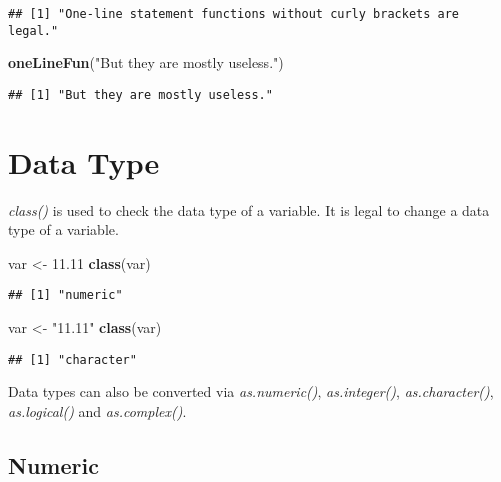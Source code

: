\documentclass[
  12pt,
]{article}
\newenvironment{Shaded}{\begin{snugshade}}{\end{snugshade}}
\newcommand{\FloatTok}[1]{\textcolor[rgb]{0.00,0.00,0.81}{#1}}
\newcommand{\FunctionTok}[1]{\textcolor[rgb]{0.13,0.29,0.53}{\textbf{#1}}}
\newcommand{\NormalTok}[1]{#1}
\newcommand{\OtherTok}[1]{\textcolor[rgb]{0.56,0.35,0.01}{#1}}
\newcommand{\StringTok}[1]{\textcolor[rgb]{0.31,0.60,0.02}{#1}}
\begin{document}
\begin{verbatim}
## [1] "One-line statement functions without curly brackets are legal."
\end{verbatim}

\begin{Shaded}
\begin{Highlighting}[]
\FunctionTok{oneLineFun}\NormalTok{(}\StringTok{"But they are mostly useless."}\NormalTok{)}
\end{Highlighting}
\end{Shaded}

\begin{verbatim}
## [1] "But they are mostly useless."
\end{verbatim}

\newpage
\section{Data Type}
\label{sec:VAR}

\textit{class()} is used to check the data type of a variable. \newline
It is legal to change a data type of a variable.

\begin{Shaded}
\begin{Highlighting}[]
\NormalTok{var }\OtherTok{\textless{}{-}} \FloatTok{11.11}
\FunctionTok{class}\NormalTok{(var)}
\end{Highlighting}
\end{Shaded}

\begin{verbatim}
## [1] "numeric"
\end{verbatim}

\begin{Shaded}
\begin{Highlighting}[]
\NormalTok{var }\OtherTok{\textless{}{-}} \StringTok{"11.11"}
\FunctionTok{class}\NormalTok{(var)}
\end{Highlighting}
\end{Shaded}

\begin{verbatim}
## [1] "character"
\end{verbatim}

Data types can also be converted via \textit{as.numeric()},
\textit{as.integer()}, \textit{as.character()}, \textit{as.logical()}
and \textit{as.complex()}.

\newpage
\subsection{Numeric}
\label{sec:VAR-numeric}
\end{document}
